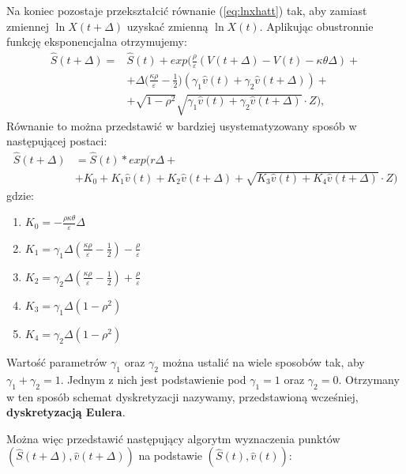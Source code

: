 \documentclass{pracamgr}
\begin{document}
Na koniec pozostaje przekształcić równanie (\ref{eq:lnxhatt}) tak, aby zamiast 
zmiennej $\ln X(t + \Delta)$ uzyskać zmienną $\ln X(t)$. Aplikując obustronnie
funkcję eksponencjalna otrzymujemy:
\begin{equation}
\begin{aligned}
\label{eq:xhatt}
\hat{S}(t + \Delta) = & \hat{S}(t)  + exp(\frac{\rho}{\varepsilon} 
(V(t + \Delta)  - V(t) - \kappa \theta \Delta) + \\
& + \Delta \Big( \frac{\kappa \rho}{\varepsilon} - 
\frac{1}{2} \Big) (\gamma_1 \hat{v}(t) + \gamma_2 \hat{v}(t + \Delta)) + \\
& + \sqrt{1-\rho^2} \sqrt{\gamma_1 \hat{v}(t) + \gamma_2 \hat{v}(t + \Delta)} \cdot Z),
\end{aligned}
\end{equation}
Równanie to można przedstawić w bardziej usystematyzowany sposób w następującej postaci:
\begin{equation}
\begin{aligned}
\label{eq:HestonInterest} 
\hat{S}(t + \Delta) &= \hat{S}(t) * exp(r \Delta +\\ 
                    &+ K_0 + K_1 \hat{v}(t) 
                    + K_2 \hat{v}(t+\Delta)
                    + \sqrt{K_3 \hat{v}(t) +  K_4 \hat{v}(t+\Delta)} \cdot Z)

\end{aligned}
\end{equation}
gdzie:
\begin{enumerate}
  \item $K_0 = - \frac{\rho \kappa \theta}{\varepsilon} \Delta$
  \item $K_1 = \gamma_1 \Delta \left(  \frac{\kappa \rho}{\varepsilon}  - \frac{1}{2}  \right) - \frac{\rho}{\varepsilon}$
  \item $K_2 = \gamma_2 \Delta \left(  \frac{\kappa \rho}{\varepsilon}  - \frac{1}{2}  \right) + \frac{\rho}{\varepsilon}$
  \item $K_3 = \gamma_1 \Delta (1 - \rho^2)$
  \item $K_4 = \gamma_2 \Delta (1 - \rho^2)$
\end{enumerate}


Wartość parametrów $\gamma_1$ oraz $\gamma_2$ można ustalić na wiele 
sposobów tak, aby $\gamma_1 + \gamma_2 = 1$. 
Jednym z nich jest podstawienie pod $\gamma_1 = 1$ oraz $\gamma_2 = 0$. Otrzymany w ten sposób 
schemat dyskretyzacji nazywamy, przedstawioną wcześniej, \textbf{dyskretyzacją Eulera}.

Można więc przedstawić następujący algorytm wyznaczenia punktów 
$(\hat{S}(t+ \Delta), \hat{v}(t+ \Delta))$ na podstawie $(\hat{S}(t), \hat{v}(t))$:
 
\end{document}
